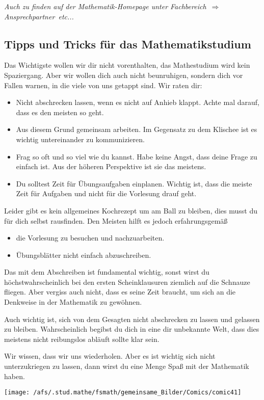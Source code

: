 {\it Auch zu finden auf der Mathematik-Homepage unter \glqq Fachbereich\grqq\ 
$\Rightarrow$ \glqq Ansprechpartner\grqq\ etc...}
\\
\subsection{Tipps und Tricks für das Mathematikstudium}
Das Wichtigste wollen wir dir nicht vorenthalten,
das Mathestudium wird kein Spaziergang.
Aber wir wollen dich auch nicht beunruhigen,
sondern dich vor Fallen warnen, in die viele von uns getappt sind.
Wir raten dir:
\begin{itemize}
\item
Nicht abschrecken lassen, wenn es nicht auf Anhieb klappt.
Achte mal darauf, dass es den meisten so geht.

\item
Aus diesem Grund gemeinsam arbeiten.
Im Gegensatz zu dem Klischee ist es wichtig untereinander zu kommunizieren.

\item
Frag so oft und so viel wie du kannst.
Habe keine Angst, dass deine Frage zu einfach ist.
Aus der höheren Perspektive ist sie das meistens.

\item
Du solltest Zeit für Übungsaufgaben einplanen.
Wichtig ist, dass die meiste Zeit für Aufgaben und nicht für die
Vorlesung drauf geht.
\end{itemize}
Leider gibt es kein allgemeines Kochrezept um am Ball zu bleiben,
dies musst du für dich selbst rausfinden.
Den Meisten hilft es jedoch erfahrungsgemäß
\begin{itemize}
\item
die Vorlesung zu besuchen und nachzuarbeiten.
\item
Übungsblätter nicht einfach abzuschreiben.
\end{itemize}
Das mit dem Abschreiben ist fundamental wichtig,
sonst wirst du höchstwahrscheinlich bei den ersten Scheinklausuren
ziemlich auf die Schnauze fliegen.
Aber vergiss auch nicht,
dass es seine Zeit braucht,
um sich an die Denkweise in der Mathematik zu gewöhnen.

Auch wichtig ist,
sich von dem Gesagten nicht abschrecken zu lassen und gelassen zu bleiben.
Wahrscheinlich begibst du dich in eine dir unbekannte Welt,
dass dies meistens nicht reibungslos abläuft sollte klar sein.

Wir wissen, dass wir uns wiederholen.
Aber es ist wichtig sich nicht unterzukriegen zu lassen,
dann wirst du eine Menge Spaß mit der Mathematik haben.
  
\newpage
\vspace*{4cm}
{

}
{
\begin{center}
  \texttt{[image: /afs/.stud.mathe/fsmath/gemeinsame\_Bilder/Comics/comic41]}
\end{center}
}
\newpage

